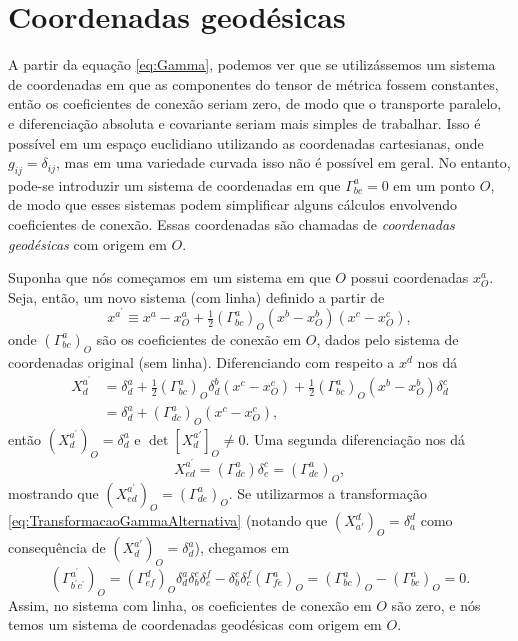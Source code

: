 \section{Coordenadas geodésicas}\label{sec:CoordenadasGeodesicas}

A partir da equação \eqref{eq:Gamma}, podemos ver que se utilizássemos um sistema de coordenadas em que as componentes do tensor de métrica fossem constantes, então os coeficientes de conexão seriam zero, de modo que o transporte paralelo, e diferenciação absoluta e covariante seriam mais simples de trabalhar. Isso é possível em um espaço euclidiano utilizando as coordenadas cartesianas, onde $g_{ij}=\delta_{ij}$, mas em uma variedade curvada isso não é possível em geral. No entanto, pode-se introduzir um sistema de coordenadas em que $\Gamma^a_{bc}=0$ em um ponto $O$, de modo que esses sistemas podem simplificar alguns cálculos envolvendo coeficientes de conexão. Essas coordenadas são chamadas de \textit{coordenadas geodésicas} com origem em $O$.

Suponha que nós começamos em um sistema em que $O$ possui coordenadas $x^a_O$. Seja, então, um novo sistema (com linha) definido a partir de
\[
	x^{a^\prime}\equiv x^a - x^a_O + \tfrac{1}{2}(\Gamma^a_{bc})_O (x^b-x^b_O)(x^c-x^c_O) 	,
\]
onde $(\Gamma^a_{bc})_O $ são os coeficientes de conexão em $O$, dados pelo sistema de coordenadas original (sem linha). Diferenciando com respeito a $x^d$ nos dá
\[
\begin{aligned} X_{d}^{a^{\prime}} &=\delta_{d}^{a}+\tfrac{1}{2}\left(\Gamma_{b c}^{a}\right)_{O} \delta_{d}^{b}\left(x^{c}-x_{O}^{c}\right)+\frac{1}{2}\left(\Gamma_{b c}^{a}\right)_{O}\left(x^{b}-x_{O}^{b}\right) \delta_{d}^{c} \\ &=\delta_{d}^{a}+\left(\Gamma_{d c}^{a}\right)_{O}\left(x^{c}-x_{O}^{c}\right) ,
\end{aligned}
\]
então $(X^{a^\prime}_d)_O=\delta^a_d$ e $\det[X^{a\prime}_d]_O\neq0$. Uma segunda diferenciação nos dá
\[
X^{a^\prime}_{ed} = (\Gamma^a_{dc})\delta^c_e = (\Gamma^a_{de})_O,
\]
mostrando que $(X^{a^\prime}_{ed})_O=(\Gamma^a_{de})_O$. Se utilizarmos a transformação \eqref{eq:TransformacaoGammaAlternativa} (notando que $(X^d_{a'})_O=\delta^d_a$ como consequência de $(X^{a'}_d)_O=\delta^a_d$), chegamos em
\[
	\left(\Gamma_{b^{\prime} c^{\prime}}^{a^{\prime}}\right)_{O}=\left(\Gamma_{e f}^{d}\right)_{O} \delta_{d}^{a} \delta_{b}^{e} \delta_{c}^{f}-\delta_{b}^{e} \delta_{c}^{f}\left(\Gamma_{f e}^{a}\right)_{O}=\left(\Gamma_{b c}^{a}\right)_{O}-\left(\Gamma_{b c}^{a}\right)_{O}=0 .
\]
Assim, no sistema com linha, os coeficientes de conexão em $O$ são zero, e nós temos um sistema de coordenadas geodésicas com origem em $O$.

